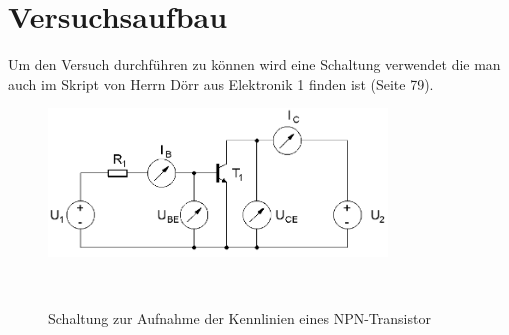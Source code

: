     \section{Versuchsaufbau}
        Um den Versuch durchführen zu können wird eine Schaltung verwendet die man auch im Skript von Herrn Dörr aus Elektronik 1 finden ist (Seite 79). 
         \begin{figure}[h!]
            \centering
            \includegraphics[width=9cm]{Bilder/npn_transistorschaltung.PNG}
            \caption{Schaltung zur Aufnahme der Kennlinien eines NPN-Transistor}
            ~\label{fig:npn_transistor}
         \end{figure}
        